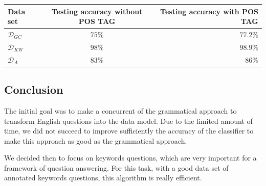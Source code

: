 \begin{center}
\begin{tabular}{|l|c|r|}
  \hline
  Data set & Testing accuracy without POS TAG & Testing accuracy with POS TAG \\
  \hline
  $\mathcal{D}_{GC}$ &  $75\%$& $77.2\%$  \\
  $\mathcal{D}_{KW}$ & $98\%$ & $98.9\%$ \\
  $\mathcal{D}_{A}$    & $83\%$ & $86\%$ \\
  \hline
\end{tabular}
\end{center}


\subsection{Conclusion}

The initial goal was to make a concurrent of the grammatical approach to transform English questions into the data model. Due to the limited amount of time, we did not succeed to improve sufficiently the accuracy of the classifier to make this approach as good as the grammatical approach.

We decided then to focus on keywords questions, which are very important for a framework of question answering. For this task, with a good data set of annotated keywords questions, this algorithm is really efficient.

